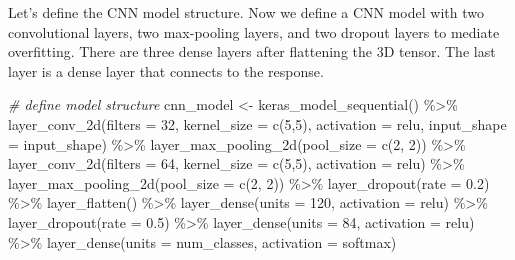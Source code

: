 \documentclass[
  12pt,
]{krantz}
\makeatletter
\newenvironment{Shaded}{\begin{snugshade}}{\end{snugshade}}
\newcommand{\AttributeTok}[1]{\textcolor[rgb]{0.61,0.61,0.61}{#1}}
\newcommand{\CommentTok}[1]{\textcolor[rgb]{0.37,0.37,0.37}{\textit{#1}}}
\newcommand{\DecValTok}[1]{\textcolor[rgb]{0.06,0.06,0.06}{#1}}
\newcommand{\FloatTok}[1]{\textcolor[rgb]{0.06,0.06,0.06}{#1}}
\newcommand{\FunctionTok}[1]{\textcolor[rgb]{0,0,0}{#1}}
\newcommand{\NormalTok}[1]{#1}
\newcommand{\OtherTok}[1]{\textcolor[rgb]{0.37,0.37,0.37}{#1}}
\newcommand{\SpecialCharTok}[1]{\textcolor[rgb]{0,0,0}{#1}}
\newcommand{\StringTok}[1]{\textcolor[rgb]{0.5,0.5,0.5}{#1}}
\newenvironment{kframe}{%
\medskip{}
\setlength{\fboxsep}{.8em}
 \def\at@end@of@kframe{}%
 \ifinner\ifhmode%
  \def\at@end@of@kframe{\end{minipage}}%
  \begin{minipage}{\columnwidth}%
 \fi\fi%
 \def\FrameCommand##1{\hskip\@totalleftmargin \hskip-\fboxsep
 \colorbox{shadecolor}{##1}\hskip-\fboxsep
     \hskip-\linewidth \hskip-\@totalleftmargin \hskip\columnwidth}%
 \MakeFramed {\advance\hsize-\width
   \@totalleftmargin\z@ \linewidth\hsize
   \@setminipage}}%
 {\par\unskip\endMakeFramed%
 \at@end@of@kframe}
\renewenvironment{Shaded}{\begin{kframe}}{\end{kframe}}
\makeatother
\begin{document}
Let's define the CNN model structure. Now we define a CNN model with two convolutional layers, two max-pooling layers, and two dropout layers to mediate overfitting. There are three dense layers after flattening the 3D tensor. The last layer is a dense layer that connects to the response.

\begin{Shaded}
\begin{Highlighting}[]
\CommentTok{\# define model structure }
\NormalTok{cnn\_model }\OtherTok{\textless{}{-}} \FunctionTok{keras\_model\_sequential}\NormalTok{() }\SpecialCharTok{\%\textgreater{}\%}
  \FunctionTok{layer\_conv\_2d}\NormalTok{(}\AttributeTok{filters =} \DecValTok{32}\NormalTok{, }
                \AttributeTok{kernel\_size =} \FunctionTok{c}\NormalTok{(}\DecValTok{5}\NormalTok{,}\DecValTok{5}\NormalTok{), }
                \AttributeTok{activation =} \StringTok{\textquotesingle{}relu\textquotesingle{}}\NormalTok{, }
                \AttributeTok{input\_shape =}\NormalTok{ input\_shape) }\SpecialCharTok{\%\textgreater{}\%} 
  \FunctionTok{layer\_max\_pooling\_2d}\NormalTok{(}\AttributeTok{pool\_size =} \FunctionTok{c}\NormalTok{(}\DecValTok{2}\NormalTok{, }\DecValTok{2}\NormalTok{)) }\SpecialCharTok{\%\textgreater{}\%} 
  \FunctionTok{layer\_conv\_2d}\NormalTok{(}\AttributeTok{filters =} \DecValTok{64}\NormalTok{, }
                \AttributeTok{kernel\_size =} \FunctionTok{c}\NormalTok{(}\DecValTok{5}\NormalTok{,}\DecValTok{5}\NormalTok{), }
                \AttributeTok{activation =} \StringTok{\textquotesingle{}relu\textquotesingle{}}\NormalTok{) }\SpecialCharTok{\%\textgreater{}\%} 
  \FunctionTok{layer\_max\_pooling\_2d}\NormalTok{(}\AttributeTok{pool\_size =} \FunctionTok{c}\NormalTok{(}\DecValTok{2}\NormalTok{, }\DecValTok{2}\NormalTok{)) }\SpecialCharTok{\%\textgreater{}\%} 
  \FunctionTok{layer\_dropout}\NormalTok{(}\AttributeTok{rate =} \FloatTok{0.2}\NormalTok{) }\SpecialCharTok{\%\textgreater{}\%} 
  \FunctionTok{layer\_flatten}\NormalTok{() }\SpecialCharTok{\%\textgreater{}\%} 
  \FunctionTok{layer\_dense}\NormalTok{(}\AttributeTok{units =} \DecValTok{120}\NormalTok{, }\AttributeTok{activation =} \StringTok{\textquotesingle{}relu\textquotesingle{}}\NormalTok{) }\SpecialCharTok{\%\textgreater{}\%} 
  \FunctionTok{layer\_dropout}\NormalTok{(}\AttributeTok{rate =} \FloatTok{0.5}\NormalTok{) }\SpecialCharTok{\%\textgreater{}\%} 
  \FunctionTok{layer\_dense}\NormalTok{(}\AttributeTok{units =} \DecValTok{84}\NormalTok{, }\AttributeTok{activation =} \StringTok{\textquotesingle{}relu\textquotesingle{}}\NormalTok{) }\SpecialCharTok{\%\textgreater{}\%} 
  \FunctionTok{layer\_dense}\NormalTok{(}\AttributeTok{units =}\NormalTok{ num\_classes, }\AttributeTok{activation =} \StringTok{\textquotesingle{}softmax\textquotesingle{}}\NormalTok{)}
\end{Highlighting}
\end{Shaded}
\end{document}
